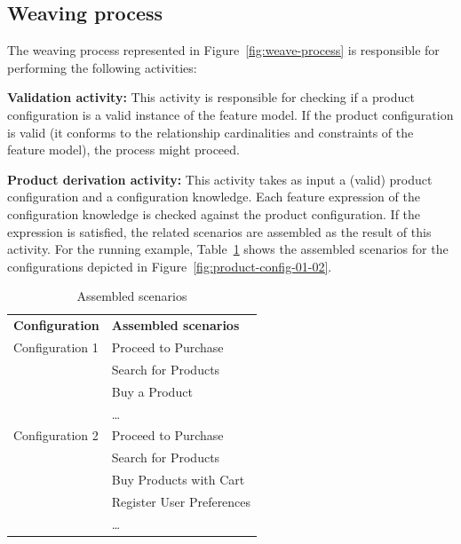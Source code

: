 \documentclass[11pt]{report}
\begin{document}
\subsection{Weaving process}\label{sub:wp}

The weaving process represented in Figure~\ref{fig:weave-process} is responsible for performing the following activities: 

{\bf Validation activity:} This activity is responsible for checking if a product configuration is a valid instance of the feature model. If the product configuration is 
valid (it conforms to the relationship cardinalities and constraints of the feature model), the process might proceed. 

{\bf Product derivation activity:} This activity takes as input a (valid) product configuration and a configuration knowledge. 
Each feature expression of the configuration knowledge is checked against the product configuration. If the expression 
is satisfied, the related scenarios are assembled as the result of this activity. For the running example, 
Table~\ref{tab:assembled-scenarios} shows the assembled scenarios for the configurations depicted in Figure~\ref{fig:product-config-01-02}.

\begin{table}[h]
\begin{center}
 \caption{Assembled scenarios} \label{tab:assembled-scenarios}
\begin{tabular}{ll}
   \hline\noalign{\smallskip}
  {\bf Configuration} & {\bf Assembled scenarios} \\
   \noalign{\smallskip}
   \hline
   \noalign{\smallskip}
    Configuration 1\hspace{15pt} & Proceed to Purchase \\
                                                   & Search for Products \\
                                                   & Buy a Product \\
                             			  & \ldots \\
   Configuration 2                        & Proceed to Purchase \\
                             			  & Search for Products	 \\
			                           & Buy Products with Cart \\
                                                   & Register User Preferences \\
                             & \ldots       \\
  \hline
\end{tabular}
\end{center}
\end{table}
 
\end{document}
